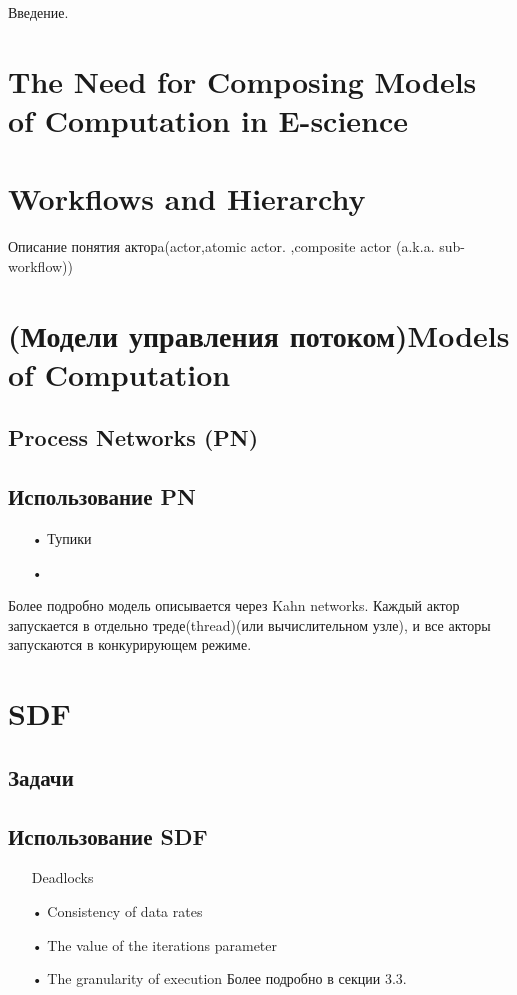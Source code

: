 \documentclass[a4paper,14pt]{article}
\begin{document}
\textwidth 15.5cm
\topmargin -1cm
\parindent 1cm
\textheight 24cm
\parskip 1.5mm
\begin{titlepage}
Введение.
\end{titlepage}



\section{The Need for Composing Models of Computation in E-science}

\section{Workflows and Hierarchy}
Описание понятия  	акторa(actor,atomic actor.
,composite actor (a.k.a. sub-workflow))
\section{(Модели управления потоком)Models of Computation}
\subsection*{Process Networks (PN)}
\subsection{Использование PN}
\begin{enumerate}
\item[•] Тупики
\item[•] 
\end{enumerate}
Более подробно модель описывается  через Kahn networks.
Каждый актор запускается в отдельно треде(thread)(или вычислительном узле), и все акторы запускаются в конкурирующем режиме. 
\section*{SDF}
\subsection{Задачи}
\subsection{Использование SDF}
\begin{enumerate}
\item[] Deadlocks
\item[•] Consistency of data rates
\item[•] The value of the iterations parameter
\item[•] The granularity of execution
 Более подробно в секции 3.3.
\end{enumerate}
\end{document}
